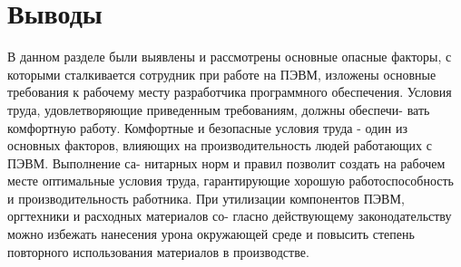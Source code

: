 \section{Выводы}
В данном разделе были выявлены и рассмотрены основные опасные факторы, с которыми сталкивается сотрудник при работе на ПЭВМ, изложены основные требования к рабочему месту разработчика программного обеспечения.
Условия труда, удовлетворяющие приведенным требованиям, должны обеспечи- вать комфортную работу. Комфортные и безопасные условия труда - один из основных факторов, влияющих на производительность людей работающих с ПЭВМ. Выполнение са- нитарных норм и правил позволит создать на рабочем месте оптимальные условия труда, гарантирующие хорошую работоспособность и производительность работника.
При утилизации компонентов ПЭВМ, оргтехники и расходных материалов со- гласно действующему законодательству можно избежать нанесения урона окружающей среде и повысить степень повторного использования материалов в производстве.

